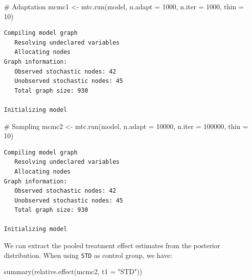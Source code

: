 \documentclass[
  letterpaper,
  DIV=11,
  numbers=noendperiod]{scrreprt}
\newenvironment{Shaded}{\begin{snugshade}}{\end{snugshade}}
\newcommand{\AttributeTok}[1]{\textcolor[rgb]{0.40,0.45,0.13}{#1}}
\newcommand{\CommentTok}[1]{\textcolor[rgb]{0.37,0.37,0.37}{#1}}
\newcommand{\DecValTok}[1]{\textcolor[rgb]{0.68,0.00,0.00}{#1}}
\newcommand{\FunctionTok}[1]{\textcolor[rgb]{0.28,0.35,0.67}{#1}}
\newcommand{\NormalTok}[1]{\textcolor[rgb]{0.00,0.23,0.31}{#1}}
\newcommand{\OtherTok}[1]{\textcolor[rgb]{0.00,0.23,0.31}{#1}}
\newcommand{\StringTok}[1]{\textcolor[rgb]{0.13,0.47,0.30}{#1}}
\begin{document}
\begin{Shaded}
\begin{Highlighting}[]
\CommentTok{\# Adaptation}
\NormalTok{mcmc1 }\OtherTok{\textless{}{-}} \FunctionTok{mtc.run}\NormalTok{(model, }\AttributeTok{n.adapt =} \DecValTok{1000}\NormalTok{, }\AttributeTok{n.iter =} \DecValTok{1000}\NormalTok{, }\AttributeTok{thin =} \DecValTok{10}\NormalTok{)}
\end{Highlighting}
\end{Shaded}

\begin{verbatim}
Compiling model graph
   Resolving undeclared variables
   Allocating nodes
Graph information:
   Observed stochastic nodes: 42
   Unobserved stochastic nodes: 45
   Total graph size: 930

Initializing model
\end{verbatim}

\begin{Shaded}
\begin{Highlighting}[]
\CommentTok{\# Sampling}
\NormalTok{mcmc2 }\OtherTok{\textless{}{-}} \FunctionTok{mtc.run}\NormalTok{(model, }\AttributeTok{n.adapt =} \DecValTok{10000}\NormalTok{, }\AttributeTok{n.iter =} \DecValTok{100000}\NormalTok{, }\AttributeTok{thin =} \DecValTok{10}\NormalTok{)}
\end{Highlighting}
\end{Shaded}

\begin{verbatim}
Compiling model graph
   Resolving undeclared variables
   Allocating nodes
Graph information:
   Observed stochastic nodes: 42
   Unobserved stochastic nodes: 45
   Total graph size: 930

Initializing model
\end{verbatim}

We can extract the pooled treatment effect estimates from the posterior
distribution. When using \texttt{STD} as control group, we have:

\begin{Shaded}
\begin{Highlighting}[]
\FunctionTok{summary}\NormalTok{(}\FunctionTok{relative.effect}\NormalTok{(mcmc2, }\AttributeTok{t1 =} \StringTok{"STD"}\NormalTok{))}
\end{Highlighting}
\end{Shaded}
\end{document}
